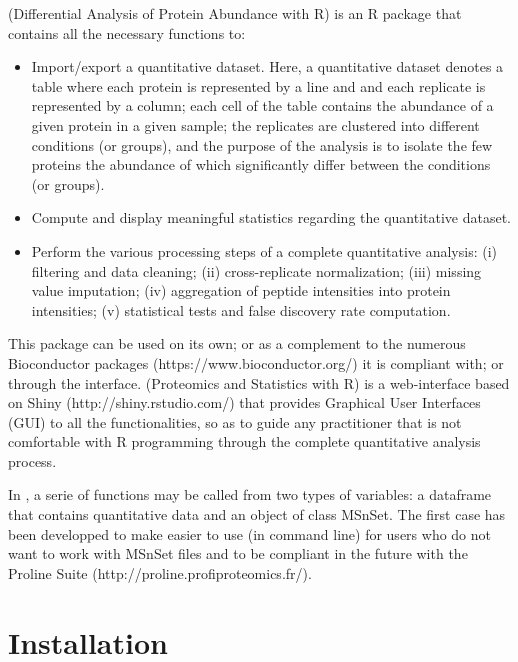 \documentclass[12pt]{article}
\begin{document}
 (Differential Analysis of Protein Abundance with R) is an R 
package that contains all the necessary functions to:
\begin{itemize}
\item {Import/export a quantitative dataset.} Here, a quantitative dataset 
denotes a table where each protein is represented by a line and and each 
replicate is represented by a column; each cell of the table contains the 
abundance of a given protein in a given sample; the replicates are clustered 
into different conditions (or groups), and the purpose of the analysis is to 
isolate the few proteins the abundance of which significantly differ between 
the conditions (or groups).
\item {Compute and display meaningful statistics regarding the quantitative 
dataset.}
\item {Perform the various processing steps of a complete quantitative 
analysis}: (i) filtering and data cleaning; (ii) cross-replicate 
normalization; (iii) missing value imputation; {(iv) aggregation of peptide 
intensities into protein intensities;} (v) statistical tests and false 
discovery rate computation.
\end{itemize}

This package can be used on its own; or as a complement to the numerous 
Bioconductor packages (https://www.bioconductor.org/) it is compliant with; 
or through the  interface.
 (Proteomics and Statistics with R) is a web-interface based 
on Shiny (http://shiny.rstudio.com/) that provides Graphical User Interfaces 
(GUI) to all the  functionalities, so as to guide any 
practitioner that is not comfortable with R programming through the complete 
quantitative analysis process.


In , a serie of functions may be called from two types of 
variables: a dataframe that contains quantitative data and an object of class 
MSnSet. The first case has been developped to make  easier to 
use (in command line) for users who do not want to work with MSnSet files and 
to be compliant in the future with the Proline Suite 
(http://proline.profiproteomics.fr/).


\section{Installation}\label{sec:install}
\end{document}
